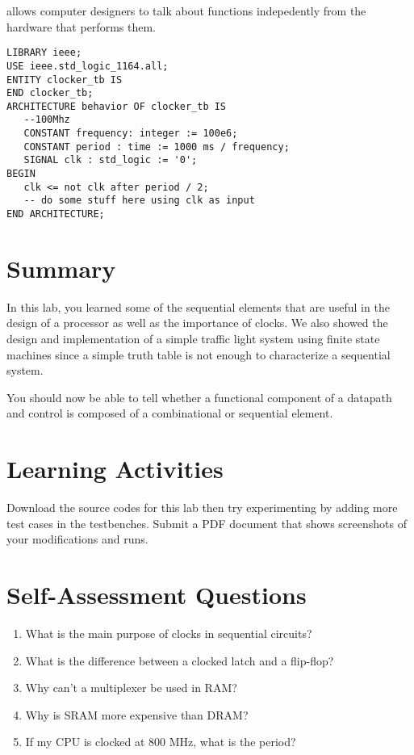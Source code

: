\documentclass[a4paper, 11pt,oneside]{article}
\begin{document}
allows computer designers to talk about functions indepedently from the 
hardware that performs them.




\begin{verbatim}
LIBRARY ieee;
USE ieee.std_logic_1164.all;
ENTITY clocker_tb IS
END clocker_tb;
ARCHITECTURE behavior OF clocker_tb IS
   --100Mhz
   CONSTANT frequency: integer := 100e6; 
   CONSTANT period : time := 1000 ms / frequency;
   SIGNAL clk : std_logic := '0';
BEGIN 
   clk <= not clk after period / 2;
   -- do some stuff here using clk as input
END ARCHITECTURE;
\end{verbatim}

\section{Summary}
In this lab, you learned some of the sequential elements that are useful in the 
design of a processor as well as the importance of clocks. We also showed the
design and implementation of a simple traffic light system using finite state 
machines since a simple truth table is not enough to characterize a sequential 
system. 

You should now be able to tell whether a functional component of a datapath and 
control is composed of a combinational or sequential element.

\section{Learning Activities}
Download the source codes for this lab then try experimenting by adding more 
test cases in the testbenches. Submit a PDF document that shows screenshots of 
your modifications and runs. 

\section{Self-Assessment Questions}
\begin{enumerate}
\item What is the main purpose of clocks in sequential circuits?
\item What is the difference between a clocked latch and a flip-flop?
\item Why can't a multiplexer be used in RAM?
\item Why is SRAM more expensive than DRAM?
\item If my CPU is clocked at 800 MHz, what is the period?
\end{enumerate}
\end{document}
